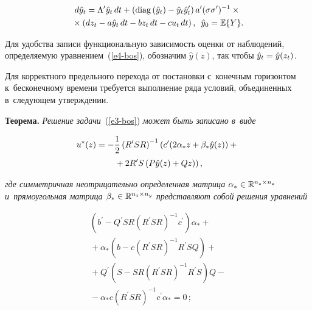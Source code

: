 \begin{multicols}{2}
\vspace*{-6pt}

\noindent
     \begin{multline}
     d\hat{y}_t=\Lambda^\prime \hat{y}_t \,dt +\left( 
\mathrm{diag}\,(\hat{y}_t) - \hat{y}_t \hat{y}_t^\prime\right) 
a^\prime(\sigma\sigma^\prime)^{-1}\times{}\\
     {}\times \left( dz_t-a\hat{y}_t\,dt -bz_t\,dt -cu_t\,dt\right) ,\enskip
     \hat{y}_0=\mathbb{E}\{Y\}.
     \label{e4-bos}
     \end{multline}
     
     \vspace*{-3pt}
     
     Для удобства записи функциональную зависимость оценки от 
наблюдений, определяемую уравнением~(\ref{e4-bos}), обозначим 
$\hat{y}(z)$, так чтобы $\hat{y}_t\hm= \hat{y}(z_t)$.
     
     Для корректного предельного перехода от постановки с~конечным 
горизонтом к~бесконечному времени требуется выполнение ряда условий, 
объединенных в~сле\-ду\-ющем утверж\-де\-нии.
     
     \smallskip
     
     \noindent
     \textbf{Теорема.} \textit{Решение задачи}~(\ref{e3-bos}) \textit{может 
быть записано в~виде}

\vspace*{-4pt}

\noindent
     \begin{multline}
     u^*(z) =-\displaystyle\frac{\displaystyle 1\mathstrut}{\displaystyle 2\mathstrut} \left( R^\prime SR\right)^{-1} \left( c^\prime 
(2\alpha_*z+\beta_* \hat{y}(z))+{}\right.\\
\left.{}+2R^\prime S \left( P\hat{y}(z)+Qz\right)\right),
     \label{e5-bos}
     \end{multline}
     
          \vspace*{-3pt}
          
          \noindent
\textit{где симметричная неотрицательно определенная мат\-ри\-ца 
$\alpha_*\hm\in \mathbb{R}^{n_z\times n_z}$ и~прямоугольная мат\-ри\-ца 
$\beta_*\hm\in \mathbb{R}^{n_z\times n_y}$ представляют собой решения 
уравнений}

\vspace*{-4pt}

\noindent
\begin{multline}
\left( b^\prime -Q^\prime SR\left(R^\prime SR\right)^{-1} c^\prime\right)\alpha_* 
+{}\\
{}+\alpha_* \left( b-c\left( R^\prime SR\right)^{-1} R^\prime SQ\right)+{}\\
{}+ Q^\prime \left( S-SR\left( R^\prime SR\right)^{-1} R^\prime S\right) Q-{}\\
{}-
\alpha_* c \left( R^\prime SR\right)^{-1} c^\prime \alpha_*=0\,;
\label{e6-bos}
\end{multline}


\end{multicols}
